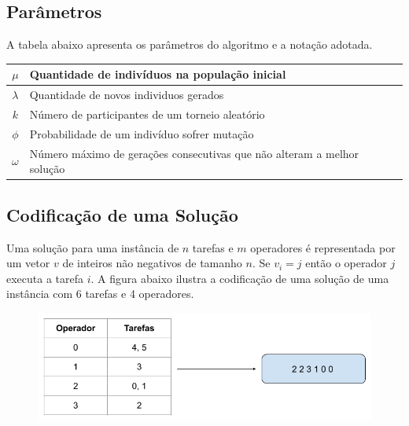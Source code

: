\documentclass{article}
\begin{document}
\subsection{Parâmetros}
\quad A tabela abaixo apresenta os parâmetros do algoritmo e a notação adotada.
\begin{table}[ht]
\centering
\begin{tabular}{c|l}
\hline
$\mu$ & Quantidade de indivíduos na população inicial \\ \hline
$\lambda$ & Quantidade de novos individuos gerados \\ \hline
$k$ & Número de participantes de um torneio aleatório \\ \hline
$\phi$ & Probabilidade de um indivíduo sofrer mutação \\ \hline
$\omega$ & Número máximo de gerações consecutivas que não alteram a melhor solução \\ \hline
\end{tabular}
\end{table}\subsection{Codificação de uma Solução}
\quad Uma solução para uma instância de $n$ tarefas e $m$ operadores é representada por um vetor $v$ de inteiros não negativos de tamanho $n$. Se $v_{i} = j$ então o operador $j$ executa a tarefa $i$. A figura abaixo ilustra a codificação de uma solução de uma instância com 6 tarefas e 4 operadores.
\begin{figure}[tph!]
\centering
\includegraphics[scale=0.35]{figure1}
\end{figure}
\end{document}
